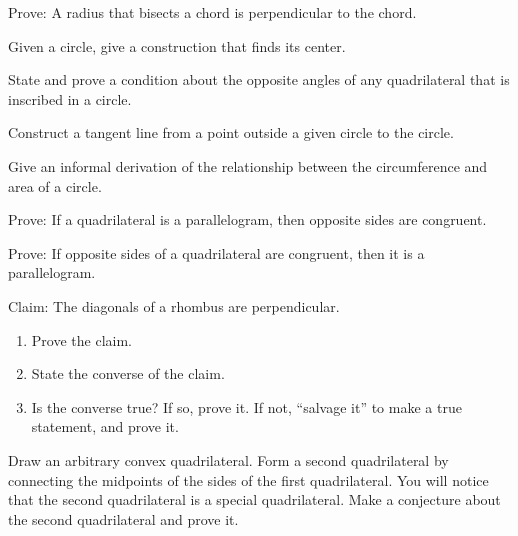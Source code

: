 \begin{prob}
Prove:  A radius that bisects a chord is perpendicular to the chord. 
\end{prob}

\begin{prob}
Given a circle, give a construction that finds its center.
\end{prob}

\begin{prob}
State and prove a condition about the opposite angles of any quadrilateral that is inscribed in a circle.  
\end{prob}

\begin{prob}
Construct a tangent line from a point outside a given circle to the circle.
\end{prob}

\begin{prob}
Give an informal derivation of the relationship between the circumference and area of a circle. 
\end{prob}

\begin{prob}
Prove:  If a quadrilateral is a parallelogram, then opposite sides are congruent.
\end{prob}

\begin{prob}
Prove:  If opposite sides of a quadrilateral are congruent, then it is a parallelogram.
\end{prob}

\begin{prob}
Claim:  The diagonals of a rhombus are perpendicular. 
\begin{enumerate}
\item Prove the claim. 
\item State the converse of the claim. 
\item Is the converse true?  If so, prove it.  If not, ``salvage it'' to make a true statement, and prove it.  
\end{enumerate}
\end{prob}


\begin{prob}
Draw an arbitrary convex quadrilateral.  Form a second quadrilateral by connecting the midpoints of the sides 
of the first quadrilateral.  You will notice that the second quadrilateral is a special quadrilateral. Make a conjecture about the second quadrilateral and prove it.  
\end{prob}

